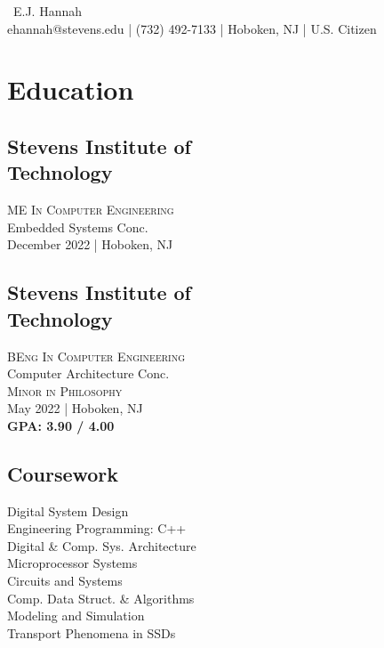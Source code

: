 \documentclass[a4paper, 11pt]{article}
\makeatletter
\renewcommand{\maketitle}{
\begin{center}
{\Huge\ E.J. }{\Huge\color{location} Hannah}\\
\vspace{0.35em}
ehannah@stevens.edu | (732) 492-7133 | Hoboken, NJ | U.S. Citizen
\end{center}
}
\makeatother
\begin{document}
\author{E.J. Hannah}
\maketitle
\vspace{-0.5em}
\makebox[\linewidth]{\rule{\paperwidth}{0.4pt}}
\begin{minipage}[h]{0.33\textwidth}
\section{Education}
\subsection{Stevens Institute of \\Technology\\}
\hspace{-7pt}\textsc{ME In Computer Engineering}\\
Embedded Systems Conc.\\
\textcolor{location}{December 2022 | Hoboken, NJ}\\

\subsection{Stevens Institute of \\Technology\\}
\hspace{-6pt}\textsc{BEng In Computer Engineering}\\
Computer Architecture Conc.\\
\textsc{Minor in Philosophy}\\
\textcolor{location}{May 2022 | Hoboken, NJ}\\
\textbf{\textcolor{location}{GPA: 3.90 / 4.00}}\\

\subsection{Coursework\\}
\hspace{-6pt}\textcolor{location}{Digital System Design\\
Engineering Programming: C++\\
Digital \& Comp. Sys. Architecture\\
Microprocessor Systems\\
Circuits and Systems\\
Comp. Data Struct. \& Algorithms\\
Modeling and Simulation\\
Transport Phenomena in SSDs\\}


\end{minipage}
\end{document}
